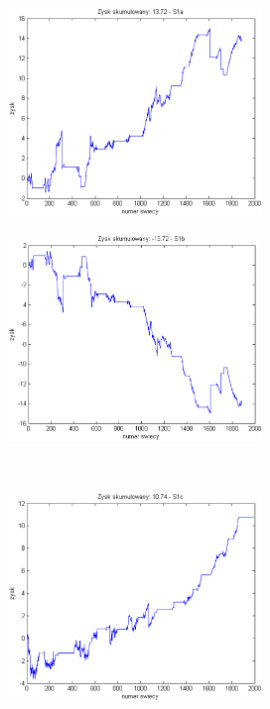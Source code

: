 \documentclass{tewiart}
\begin{document}
\FloatBarrier
\begin{figure}[h]
\centering
\begin{minipage}{\linewidth}
\centering
\includegraphics[width=0.6\textwidth]{images/nzdjpyS1a.eps}
\label{jedno}
\end{minipage}
\begin{minipage}{\linewidth}
\centering
\includegraphics[width=0.6\textwidth]{images/nzdjpyS1b.eps}
\label{dwu}
\end{minipage}
\\
\begin{minipage}{\linewidth}
\centering
\includegraphics[width=0.6\textwidth]{images/nzdjpyS1c.eps}

\end{minipage}
\end{figure}
\end{document}

